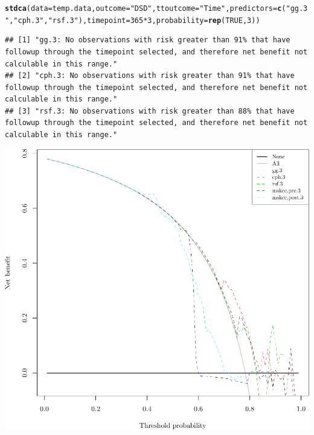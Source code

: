 \documentclass{article}\usepackage[]{graphicx}\usepackage[]{color}
\makeatletter
\def\maxwidth{ %
  \ifdim\Gin@nat@width>\linewidth
    \linewidth
  \else
    \Gin@nat@width
  \fi
}
\newcommand{\hlnum}[1]{\textcolor[rgb]{0.686,0.059,0.569}{#1}}%
\newcommand{\hlstr}[1]{\textcolor[rgb]{0.192,0.494,0.8}{#1}}%
\newcommand{\hlopt}[1]{\textcolor[rgb]{0,0,0}{#1}}%
\newcommand{\hlstd}[1]{\textcolor[rgb]{0.345,0.345,0.345}{#1}}%
\newcommand{\hlkwc}[1]{\textcolor[rgb]{0.333,0.667,0.333}{#1}}%
\newcommand{\hlkwd}[1]{\textcolor[rgb]{0.737,0.353,0.396}{\textbf{#1}}}%
\newenvironment{kframe}{%
 \def\at@end@of@kframe{}%
 \ifinner\ifhmode%
  \def\at@end@of@kframe{\end{minipage}}%
  \begin{minipage}{\columnwidth}%
 \fi\fi%
 \def\FrameCommand##1{\hskip\@totalleftmargin \hskip-\fboxsep
 \colorbox{shadecolor}{##1}\hskip-\fboxsep
     \hskip-\linewidth \hskip-\@totalleftmargin \hskip\columnwidth}%
 \MakeFramed {\advance\hsize-\width
   \@totalleftmargin\z@ \linewidth\hsize
   \@setminipage}}%
 {\par\unskip\endMakeFramed%
 \at@end@of@kframe}
\newenvironment{knitrout}{}{} %
\makeatother
\begin{document}
\begin{knitrout}
\begin{kframe}
\begin{alltt}
\hlkwd{stdca}\hlstd{(}\hlkwc{data} \hlstd{= temp.data,} \hlkwc{outcome} \hlstd{=} \hlstr{"DSD"}\hlstd{,} \hlkwc{ttoutcome} \hlstd{=} \hlstr{"Time"}\hlstd{,} \hlkwc{predictors} \hlstd{=} \hlkwd{c}\hlstd{(}\hlstr{"gg.3"}\hlstd{,} \hlstr{"cph.3"}\hlstd{,} \hlstr{"rsf.3"}\hlstd{),} \hlkwc{timepoint} \hlstd{=} \hlnum{365}\hlopt{*}\hlnum{3}\hlstd{,} \hlkwc{probability} \hlstd{=} \hlkwd{rep}\hlstd{(}\hlnum{TRUE}\hlstd{,} \hlnum{3}\hlstd{))}
\end{alltt}
\begin{verbatim}
## [1] "gg.3: No observations with risk greater than 91% that have followup through the timepoint selected, and therefore net benefit not calculable in this range." 
## [2] "cph.3: No observations with risk greater than 91% that have followup through the timepoint selected, and therefore net benefit not calculable in this range."
## [3] "rsf.3: No observations with risk greater than 88% that have followup through the timepoint selected, and therefore net benefit not calculable in this range."
\end{verbatim}
\end{kframe}

{\centering \includegraphics[width=\maxwidth]{figure/05-model-selection-dca-3} 

}



\end{knitrout}
\end{document}
